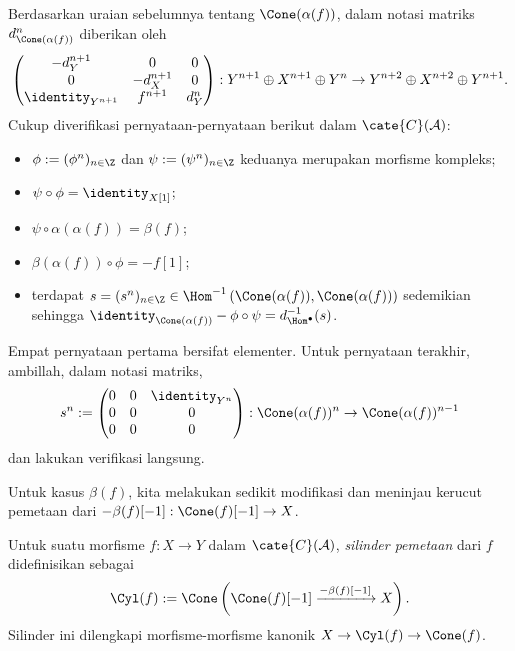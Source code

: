 \begin{bukti}
	Berdasarkan uraian sebelumnya tentang $\Cone(\alpha(f))$, dalam notasi
	matriks $d_{\Cone(\alpha(f))}^n$ diberikan oleh
	\[ \begin{pmatrix} -d_Y^{n+1} & 0 & 0 \\ 0 & -d_X^{n+1} & 0 \\ \identity_{Y^{n+1}} & f^{n+1} & d_Y^n \end{pmatrix} : Y^{n+1} \oplus X^{n+1} \oplus Y^n \to Y^{n+2} \oplus X^{n+2} \oplus Y^{n+1}. \]
	Cukup diverifikasi pernyataan-pernyataan berikut dalam
	$\cate{C}(\mathcal{A})$:
	\begin{itemize}
		\item $\phi:=(\phi^n)_{n\in\Z}$ dan $\psi:=(\psi^n)_{n\in\Z}$
		keduanya merupakan morfisme kompleks;
		\item $\psi\circ\phi=\identity_{X[1]}$;
		\item $\psi\circ\alpha(\alpha(f))=\beta(f)$;
		\item $\beta(\alpha(f))\circ\phi=-f[1]$;
		\item terdapat
		$s=(s^n)_{n\in\Z}\in\Hom^{-1}\left(\Cone(\alpha(f)),
		\Cone(\alpha(f))\right)$ sedemikian sehingga
		$\identity_{\Cone(\alpha(f))}-\phi\circ\psi
		=d^{-1}_{\Hom^\bullet}(s)$.
	\end{itemize}
	Empat pernyataan pertama bersifat elementer. Untuk pernyataan terakhir,
	ambillah, dalam notasi matriks,
	\[ s^n := \begin{pmatrix} 0 & 0 & \identity_{Y^n} \\ 0 & 0 & 0 \\ 0 & 0 & 0 \end{pmatrix}: \Cone(\alpha(f))^n \to \Cone(\alpha(f))^{n-1} \]
	dan lakukan verifikasi langsung.
\end{bukti}

Untuk kasus $\beta(f)$, kita melakukan sedikit modifikasi dan meninjau
kerucut pemetaan dari $-\beta(f)[-1]:\Cone(f)[-1]\to X$.

\begin{definisi}\label{def:Cyl}
	Untuk suatu morfisme $f:X\to Y$ dalam $\cate{C}(\mathcal{A})$,
	\emph{silinder pemetaan} dari $f$ didefinisikan sebagai
	\[ \Cyl(f) := \Cone\left( \Cone(f)[-1] \xrightarrow{-\beta(f)[-1]} X \right). \]
	Silinder ini dilengkapi morfisme-morfisme kanonik
	$X\to\Cyl(f)\to\Cone(f)$.
\end{definisi}


